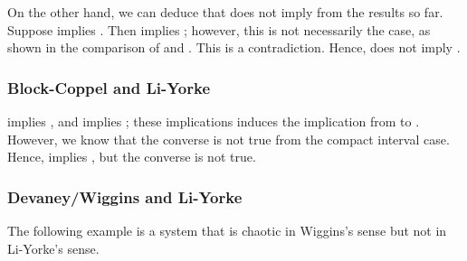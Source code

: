 \documentclass[10pt,twoside,draft]{book}
\begin{document}
On the other hand, we can deduce that \dev does not imply \blcp from the results so far.
Suppose \dev implies \blcp.
Then \dev implies \akm; however, this is not necessarily the case, as shown in the comparison of \dev and \akm.
This is a contradiction. 
Hence, \dev does not imply \blcp.

\subsubsection*{Block-Coppel and Li-Yorke}
\blcp implies \akm, and \akm implies \liy; these implications induces the implication from \blcp to \liy.
However, we know that the converse is not true from the compact interval case.
Hence, \blcp implies \liy, but the converse is not true.

\subsubsection*{Devaney/Wiggins and Li-Yorke}
The following example is a system that is chaotic in Wiggins's sense but not in Li-Yorke's sense.
\end{document}
